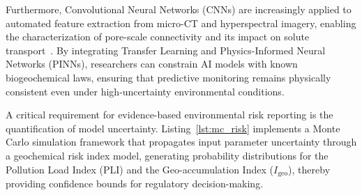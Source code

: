 \documentclass[environremediat,article,accept,pdftex,oneauthor]{Definitions/mdpi}
\begin{document}
Furthermore, Convolutional Neural Networks (CNNs) are increasingly applied to
automated feature extraction from micro-CT and hyperspectral imagery, enabling
the characterization of pore-scale connectivity and its impact on solute
transport~\cite{Yaqoob}. By integrating Transfer Learning and
Physics-Informed Neural Networks (PINNs), researchers can constrain AI models
with known biogeochemical laws, ensuring that predictive monitoring remains
physically consistent even under high-uncertainty environmental conditions.

A critical requirement for evidence-based environmental risk reporting is the
quantification of model uncertainty. Listing~\ref{lst:mc_risk} implements a
Monte Carlo simulation framework that propagates input parameter uncertainty
through a geochemical risk index model, generating probability distributions
for the Pollution Load Index (PLI) and the Geo-accumulation Index
($I_\mathrm{geo}$), thereby providing confidence bounds for regulatory
decision-making.
\end{document}
